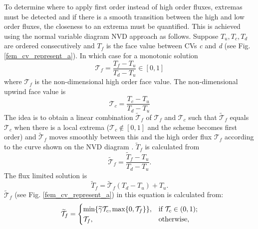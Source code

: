 To determine where to apply first order instead of high order fluxes, extremas must be detected and if there is a smooth transition between the high and low order fluxes, the closeness to an extrema must be quantified. This is achieved using the normal variable diagram NVD approach  as follows. Suppose $T_{u}, T_{c}, T_{d}$ are ordered consecutively and $T_{f}$ is the face value between CVs \textit{c} and \textit{d} (see Fig. \ref{fem_cv_represent_a}). In which case for a monotonic solution
\begin{equation}
\mathcal{T}_{f} = \frac{T_{f} - T_{u}}{T_{d} - T_{u}}  \in [0,1]
\label{p4a}
\end{equation}
where $\mathcal{T}_{f}$ is the non-dimensional high order face value.  The non-dimensional upwind face value is
\begin{equation}
\mathcal{T}_{c} = \frac{T_{c} - T_{u}}{T_{d} - T_{u}}
\label{p4b}
\end{equation}
The idea is to obtain a linear combination $\widetilde{\mathcal{T}}_{f}$ of $\mathcal{T}_{f}$ and $\mathcal{T}_{c}$ such that $\widetilde{\mathcal{T}}_{f}$ equals $\mathcal{T}_{c}$ when there is a local extrema ($\mathcal{T}_{c} \notin [0,1]$ and the scheme becomes first order) and $\widetilde{\mathcal{T}}_{f}$ moves smoothly between this and the high order flux $\mathcal{T}_{f}$ according to the curve shown on the NVD diagram \citep[see][]{gomes_2008}. $\widetilde{T}_{f}$ is calculated from
\begin{equation}
\widetilde{\mathcal{T}}_{f} = \frac{\widetilde{T}_{f} - T_{u}}{T_{d} - T_{u}}.
\label{2.1a}
\end{equation}
The flux limited solution is
\begin{equation}
\widetilde{T}_{f} = \widetilde{\mathcal{T}}_{f} (T_{d} - T_{u}) + T_{u}.
\label{2.1b}
\end{equation}
$\widetilde{\mathcal{T}}_{f}$ (see Fig. \ref{fem_cv_represent_a}) in this equation is calculated from:%
\begin{equation}
\widetilde{\mathcal{T}}_{f} =
  \begin{cases}
    \min \{ \widetilde{\gamma} {\cal T}_{c}, \max \{ 0, {\cal T}_f\} \}, & \text{if} \
    \mathcal{T}_{c} \in (0,1); \\
    \mathcal{T}_{f},  & \text{otherwise},
  \end{cases}
\label{2.1c}
\end{equation}
